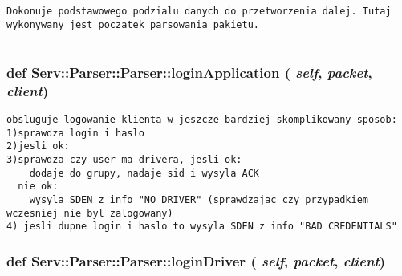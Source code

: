 \footnotesize\begin{verbatim}Dokonuje podstawowego podzialu danych do przetworzenia dalej. Tutaj wykonywany jest poczatek parsowania pakietu.
    
\end{verbatim}
\normalsize
 \hypertarget{class_serv_1_1_parser_1_1_parser_ec3286787a7c8642127416c77e1c2c8f}{
\subsubsection[{loginApplication}]{\setlength{\rightskip}{0pt plus 5cm}def Serv::Parser::Parser::loginApplication ( {\em self}, \/   {\em packet}, \/   {\em client})}}
\label{class_serv_1_1_parser_1_1_parser_ec3286787a7c8642127416c77e1c2c8f}




\footnotesize\begin{verbatim}obsluguje logowanie klienta w jeszcze bardziej skomplikowany sposob:
1)sprawdza login i haslo
2)jesli ok:
3)sprawdza czy user ma drivera, jesli ok:
    dodaje do grupy, nadaje sid i wysyla ACK
  nie ok:
    wysyla SDEN z info "NO DRIVER" (sprawdzajac czy przypadkiem wczesniej nie byl zalogowany)
4) jesli dupne login i haslo to wysyla SDEN z info "BAD CREDENTIALS"

\end{verbatim}
\normalsize
 \hypertarget{class_serv_1_1_parser_1_1_parser_e092cef5abd35ec04fa61e71377e1303}{
\subsubsection[{loginDriver}]{\setlength{\rightskip}{0pt plus 5cm}def Serv::Parser::Parser::loginDriver ( {\em self}, \/   {\em packet}, \/   {\em client})}}
\label{class_serv_1_1_parser_1_1_parser_e092cef5abd35ec04fa61e71377e1303}




